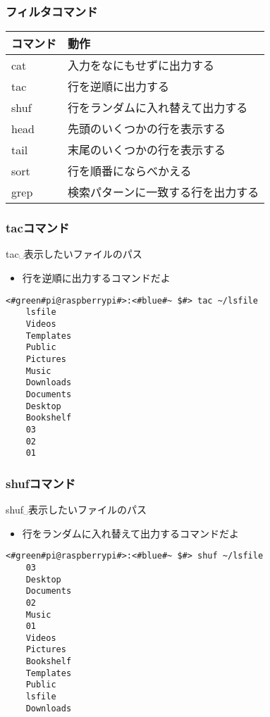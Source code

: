 \begin{frame}
    \frametitle{フィルタコマンド}
    \begin{tabular}{ll}
        コマンド & 動作                               \\ \hline
        cat      & 入力をなにもせずに出力する         \\
        tac      & 行を逆順に出力する                 \\
        shuf     & 行をランダムに入れ替えて出力する   \\
        head     & 先頭のいくつかの行を表示する       \\
        tail     & 末尾のいくつかの行を表示する       \\
        sort     & 行を順番にならべかえる             \\
        grep     & 検索パターンに一致する行を出力する \\ \hline
    \end{tabular}
\end{frame}

\begin{frame}[fragile]
    \frametitle{tacコマンド}
    tac␣表示したいファイルのパス
    \begin{itemize}
        \item 行を逆順に出力するコマンドだよ
    \end{itemize}
    \begin{lstlisting}[title=tacコマンドの実行例, label=tac_example]
    <#green#pi@raspberrypi#>:<#blue#~ $#> tac ~/lsfile
    lsfile
    Videos
    Templates
    Public
    Pictures
    Music
    Downloads
    Documents
    Desktop
    Bookshelf
    03
    02
    01 
    \end{lstlisting}
\end{frame}

\begin{frame}[fragile]
    \frametitle{shufコマンド}
    shuf␣表示したいファイルのパス
    \begin{itemize}
        \item 行をランダムに入れ替えて出力するコマンドだよ
    \end{itemize}
    \begin{lstlisting}[title=shufコマンドの実行例, label=shuf_example]
    <#green#pi@raspberrypi#>:<#blue#~ $#> shuf ~/lsfile
    03
    Desktop
    Documents
    02
    Music
    01
    Videos
    Pictures
    Bookshelf
    Templates
    Public
    lsfile
    Downloads
    \end{lstlisting}
\end{frame}

